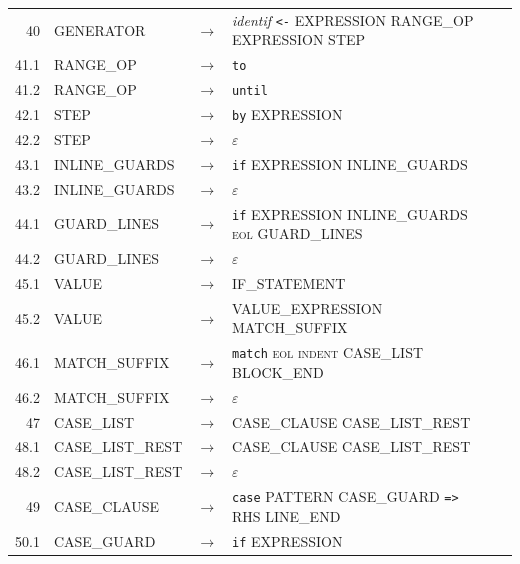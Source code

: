 \documentclass[11pt,a4paper]{article}
\begin{document}
{\begin{longtable}{r l c >{\raggedright\arraybackslash}p{6.6cm} >{\raggedright\arraybackslash}p{3.2cm}}
40 & \textsf{GENERATOR} & $\rightarrow$ & \textit{identif} \texttt{<-} \textsf{EXPRESSION} \textsf{RANGE\_OP} \textsf{EXPRESSION} \textsf{STEP} & {\scriptsize } \\
41.1 & \textsf{RANGE\_OP} & $\rightarrow$ & \texttt{to} & {\scriptsize } \\
41.2 & \textsf{RANGE\_OP} & $\rightarrow$ & \texttt{until} & {\scriptsize } \\
42.1 & \textsf{STEP} & $\rightarrow$ & \texttt{by} \textsf{EXPRESSION} & {\scriptsize } \\
42.2 & \textsf{STEP} & $\rightarrow$ & $\varepsilon$ & {\scriptsize } \\
43.1 & \textsf{INLINE\_GUARDS} & $\rightarrow$ & \texttt{if} \textsf{EXPRESSION} \textsf{INLINE\_GUARDS} & {\scriptsize } \\
43.2 & \textsf{INLINE\_GUARDS} & $\rightarrow$ & $\varepsilon$ & {\scriptsize } \\
44.1 & \textsf{GUARD\_LINES} & $\rightarrow$ & \texttt{if} \textsf{EXPRESSION} \textsf{INLINE\_GUARDS} \textsc{eol} \textsf{GUARD\_LINES} & {\scriptsize } \\
44.2 & \textsf{GUARD\_LINES} & $\rightarrow$ & $\varepsilon$ & {\scriptsize } \\
45.1 & \textsf{VALUE} & $\rightarrow$ & \textsf{IF\_STATEMENT} & {\scriptsize } \\
45.2 & \textsf{VALUE} & $\rightarrow$ & \textsf{VALUE\_EXPRESSION} \textsf{MATCH\_SUFFIX} & {\scriptsize } \\
46.1 & \textsf{MATCH\_SUFFIX} & $\rightarrow$ & \texttt{match} \textsc{eol} \textsc{indent} \textsf{CASE\_LIST} \textsf{BLOCK\_END} & {\scriptsize } \\
46.2 & \textsf{MATCH\_SUFFIX} & $\rightarrow$ & $\varepsilon$ & {\scriptsize } \\
47 & \textsf{CASE\_LIST} & $\rightarrow$ & \textsf{CASE\_CLAUSE} \textsf{CASE\_LIST\_REST} & {\scriptsize } \\
48.1 & \textsf{CASE\_LIST\_REST} & $\rightarrow$ & \textsf{CASE\_CLAUSE} \textsf{CASE\_LIST\_REST} & {\scriptsize } \\
48.2 & \textsf{CASE\_LIST\_REST} & $\rightarrow$ & $\varepsilon$ & {\scriptsize } \\
49 & \textsf{CASE\_CLAUSE} & $\rightarrow$ & \texttt{case} \textsf{PATTERN} \textsf{CASE\_GUARD} \texttt{=>} \textsf{RHS} \textsf{LINE\_END} & {\scriptsize } \\
50.1 & \textsf{CASE\_GUARD} & $\rightarrow$ & \texttt{if} \textsf{EXPRESSION} & {\scriptsize } \\

\end{longtable}}
\end{document}
